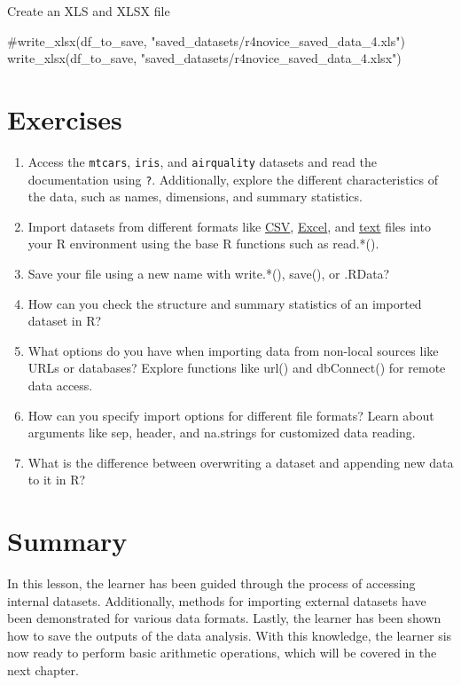 \documentclass[
  letterpaper,
  DIV=11,
  numbers=noendperiod]{scrreprt}
\newenvironment{Shaded}{\begin{snugshade}}{\end{snugshade}}
\newcommand{\CommentTok}[1]{\textcolor[rgb]{0.37,0.37,0.37}{#1}}
\newcommand{\FunctionTok}[1]{\textcolor[rgb]{0.28,0.35,0.67}{#1}}
\newcommand{\NormalTok}[1]{\textcolor[rgb]{0.00,0.23,0.31}{#1}}
\newcommand{\StringTok}[1]{\textcolor[rgb]{0.13,0.47,0.30}{#1}}
\begin{document}
Create an XLS and XLSX file

\begin{Shaded}
\begin{Highlighting}[]
\CommentTok{\#write\_xlsx(df\_to\_save, "saved\_datasets/r4novice\_saved\_data\_4.xls")}
\FunctionTok{write\_xlsx}\NormalTok{(df\_to\_save, }\StringTok{"saved\_datasets/r4novice\_saved\_data\_4.xlsx"}\NormalTok{)}
\end{Highlighting}
\end{Shaded}

\section{Exercises}\label{exercises-4}

\begin{enumerate}
\def\labelenumi{\roman{enumi}.}
\item
  Access the \texttt{mtcars}, \texttt{iris}, and \texttt{airquality}
  datasets and read the documentation using \texttt{?}. Additionally,
  explore the different characteristics of the data, such as names,
  dimensions, and summary statistics.
\item
  Import datasets from different formats like \href{}{CSV},
  \href{}{Excel}, and \href{}{text} files into your R environment using
  the base R functions such as read.*().
\item
  Save your file using a new name with write.*(), save(), or .RData?
\item
  How can you check the structure and summary statistics of an imported
  dataset in R?
\item
  What options do you have when importing data from non-local sources
  like URLs or databases? Explore functions like url() and dbConnect()
  for remote data access.
\item
  How can you specify import options for different file formats? Learn
  about arguments like sep, header, and na.strings for customized data
  reading.
\item
  What is the difference between overwriting a dataset and appending new
  data to it in R?
\end{enumerate}

\section{Summary}\label{summary-4}

In this lesson, the learner has been guided through the process of
accessing internal datasets. Additionally, methods for importing
external datasets have been demonstrated for various data formats.
Lastly, the learner has been shown how to save the outputs of the data
analysis. With this knowledge, the learner sis now ready to perform
basic arithmetic operations, which will be covered in the next chapter.
\end{document}
